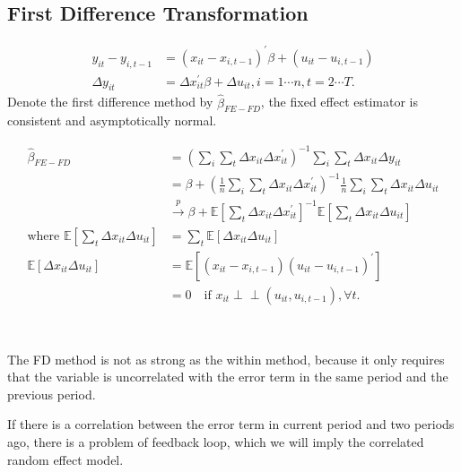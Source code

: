 \subsection{First Difference Transformation}
\begin{align*}
    y_{it} - y_{i, t-1} &= (x_{it} - x_{i, t-1})^{\prime} \beta + (u_{it} - u_{i, t-1}) \\
    \Delta y_{it} &= \Delta x_{it}^{\prime} \beta + \Delta u_{it}, i=1 \cdots n, t=2 \cdots T.
\end{align*}
Denote the first difference method by $\hat{\beta}_{FE-FD}$, the fixed effect estimator is consistent and asymptotically normal.

\begin{align*}
    \hat{\beta}_{FE-FD} &= \left(\sum_i \sum_t \Delta x_{it} \Delta x_{it}^{\prime} \right)^{-1} \sum_i \sum_t \Delta x_{it} \Delta y_{it} \\
    &= \beta + \left(\frac{1}{n} \sum_i \sum_t \Delta x_{it} \Delta x_{it}^{\prime} \right)^{-1} \frac{1}{n} \sum_i \sum_t \Delta x_{it} \Delta u_{it} \\
    &\overset{p}{\rightarrow} \beta + \mathbb{E}\left[\sum_t \Delta x_{it} \Delta x_{it}^{\prime} \right]^{-1} \mathbb{E}\left[\sum_t \Delta x_{it} \Delta u_{it} \right] \\
    \text{where } \mathbb{E}\left[\sum_t \Delta x_{it} \Delta u_{it}\right] &= \sum_t \mathbb{E}\left[\Delta x_{it} \Delta u_{it} \right]\\
    \mathbb{E}\left[\Delta x_{it} \Delta u_{it} \right] &= \mathbb{E}\left[\left(x_{it} - x_{i, t-1} \right) \left(u_{it} - u_{i, t-1} \right)^{\prime} \right] \\
    &= 0 \quad \text{if } x_{it} \perp\!\!\!\perp (u_{it}, u_{i, t-1}), \forall t.
\end{align*}

\begin{note}
    \

    The FD method is not as strong as the within method, because it only requires that the variable is
    uncorrelated with the error term in the same period and the previous period.

    If there is a correlation between the error term in current period and two periods ago, there is a problem of feedback loop,
    which we will imply the correlated random effect model.
\end{note}
